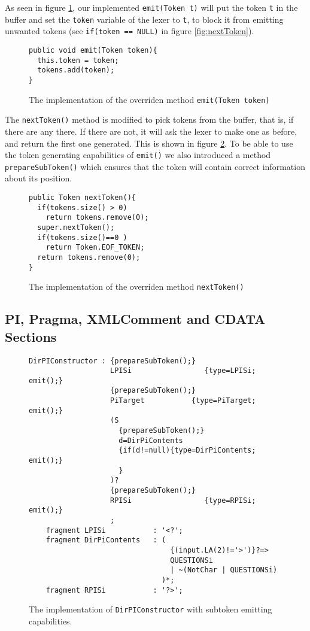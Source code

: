 As seen in figure \ref{fig:emitToken}, our implemented \verb!emit(Token t)!
will put the token \verb!t! in the buffer and set the \verb!token! variable of the lexer to \verb!t!, to block it from emitting unwanted tokens (see \verb!if(token == NULL)! in figure \ref{fig:nextToken}).
\begin{figure}[h!]
\begin{Verbatim}
public void emit(Token token){
  this.token = token;
  tokens.add(token);
}
\end{Verbatim}
\caption[The overridden \texttt{emit(Token t)}]{The implementation of the overriden method \texttt{emit(Token token)}}
\label{fig:emitToken}
\end{figure}

The \verb!nextToken()! method is modified to pick tokens from the buffer, that is, if there are any there. If there are not, it will ask the lexer to make one as before, and return the first one generated. This is shown in figure \ref{fig:newNextToken}. To be able to use the token generating capabilities of \verb!emit()! we also introduced a method \verb!prepareSubToken()! which ensures that the token will contain correct information about its position.

\begin{figure}[h!]
\begin{Verbatim}
public Token nextToken(){
  if(tokens.size() > 0)
    return tokens.remove(0);
  super.nextToken();
  if(tokens.size()==0 )
    return Token.EOF_TOKEN;
  return tokens.remove(0);
}
\end{Verbatim}
\caption[The overridden \texttt{nextToken()}]{The implementation of the overriden method \texttt{nextToken()}}
\label{fig:newNextToken}
\end{figure}


\subsection{PI, Pragma, XMLComment and CDATA Sections}

\begin{figure}[h!]
\begin{Verbatim}
DirPIConstructor : {prepareSubToken();}
                   LPISi                 {type=LPISi; emit();}
                   {prepareSubToken();}
                   PiTarget           {type=PiTarget; emit();}
                   (S
                     {prepareSubToken();}
                     d=DirPiContents
                     {if(d!=null){type=DirPiContents; emit();} 
                     } 
                   )?
                   {prepareSubToken();}
                   RPISi                 {type=RPISi; emit();}
                   ;
    fragment LPISi           : '<?';
    fragment DirPiContents   : (
                                 {(input.LA(2)!='>')}?=>
                                 QUESTIONSi 
                                 | ~(NotChar | QUESTIONSi)
                               )*;
    fragment RPISi           : '?>';
\end{Verbatim}
\caption[\texttt{DirPIConstructor} emitting subtokens]{The implementation of \texttt{DirPIConstructor} with subtoken emitting capabilities.}
\label{fig:pragmaLEX}
\end{figure}

